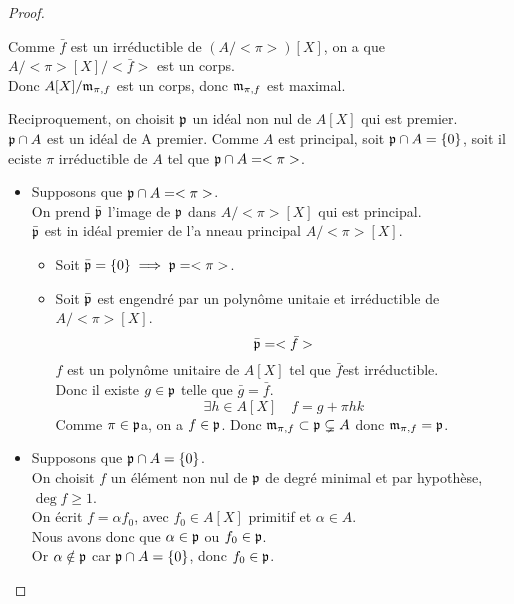 \begin{proof}
\begin{itemize}
		      Comme $\bar{f}$ est un irréductible de $(A/<\pi>)[X]$, on a que $A/<\pi>[X]/<\bar{f}>$ est un corps.\\
		      Donc $A[X]/\mathfrak{m}_{\pi,f}$ est un corps, donc $\mathfrak{m}_{\pi,f}$ est maximal.
	\end{itemize}
	\vspace{0.25cm}
	\noindent Reciproquement, on choisit $\mathfrak{p}$ un idéal non nul de $A[X]$ qui est premier. \\
	$\mathfrak{p} \cap A$ est un idéal de A premier.
	Comme $A$ est principal, soit $\mathfrak{p} \cap A = \{0\}$, soit il eciste $\pi$ irréductible de $A$ tel que $\mathfrak{p} \cap A = <\pi>$.
	\begin{itemize}
		\item Supposons que $\mathfrak{p} \cap A = <\pi>$.\\
		      On prend $\bar{\mathfrak{p}}$ l'image de $\mathfrak{p}$ dans $A/<\pi>[X]$ qui est principal.\\
		      $\bar{\mathfrak{p}}$ est in idéal premier de l'a nneau principal $A/<\pi>[X]$.\\
		      \begin{itemize}
			      \item Soit $\bar{\mathfrak{p}} = \{0\} \implies \mathfrak{p} = <\pi>$.
			      \item Soit $\bar{\mathfrak{p}}$ est engendré par un polynôme unitaie et irréductible de $A/<\pi>[X]$.
			            $$ \bar{\mathfrak{p}} = <\bar{f}> $$
			            $f$ est un polynôme unitaire de $A[X]$ tel que $\bar{f}$est irréductible. \\
			            Donc il existe $g \in \mathfrak{p}$ telle que $\bar{g} = \bar{f}$.
			            $$ \exists h \in A[X] \quad f = g + \pi h k$$
			            Comme $\pi \in \mathfrak{p}$a, on a $f \in \mathfrak{p}$.
			            Donc $\mathfrak{m}_{\pi,f} \subset \mathfrak{p} \subsetneq A$
			            donc $\mathfrak{m}_{\pi,f} = \mathfrak{p}$.
		      \end{itemize}
		\item Supposons que $\mathfrak{p} \cap A = \{0\}$.\\
		      On choisit $f$ un élément non nul de $\mathfrak{p}$ de degré minimal et par hypothèse, $\deg f \geq 1$.\\
		      On écrit $f = \alpha f_0$, avec $f_0 \in A[X]$ primitif et $\alpha \in A$.\\
		      Nous avons donc que $\alpha \in \mathfrak{p}$ ou $f_0 \in \mathfrak{p}$. \\
		      Or $\alpha \notin \mathfrak{p}$ car $\mathfrak{p} \cap A = \{0\}$, donc $f_0 \in \mathfrak{p}$.\\

\end{itemize}
\end{proof}
